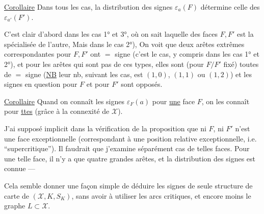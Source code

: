 
\uline{Corollaire} Dans tous les cas, la distribution des signes $\varepsilon_a(F)$ détermine celle des $\varepsilon_{a'}(F')$. 

C'est clair d'abord dans les cas 1° et 3°, où on sait laquelle des faces $F,F'$ est la spécialisée de l'autre,  Mais dans le cas  2°),  On voit que  deux  arêtes extrêmes correspondantes pour $F,F'$ ont $=$ signe (c'est  le cas, y compris dans les cas 1° et 2°), et pour les arêtes qui  sont pas de ces types, elles sont (pour $F/F'$ fixé) toutes de $=$ signe (\uline{NB} leur nb, suivant les cas, est $(1,0)$, $(1,1)$ ou $(1,2)$) et les signes en question pour $F$ et pour $F'$ sont opposés.

\uline{Corollaire} Quand on connaît les signes $\varepsilon_F(a)$ pour \uline{une} face $F$, on les connaît pour \uline{ttes} (grâce à la connexité de $\mathcal X$).

J'ai supposé implicit  dans la vérification de la proposition que ni $F$, ni $F'$ n'est une face exceptionnelle (correspondant à une position relative exceptionnelle, i.e. ``supercritique''). Il faudrait que j'examine séparément  cas de telles faces. Pour une telle face, il n'y a que quatre grandes arêtes, et la distribution des signes est connue ---

Cela semble donner une façon simple de déduire les signes  de  seule structure de carte de $(\mathcal X,K,S_K)$, sans avoir à utiliser les arcs critiques, et encore moins  le  graphe $L\subset\mathcal X$.
